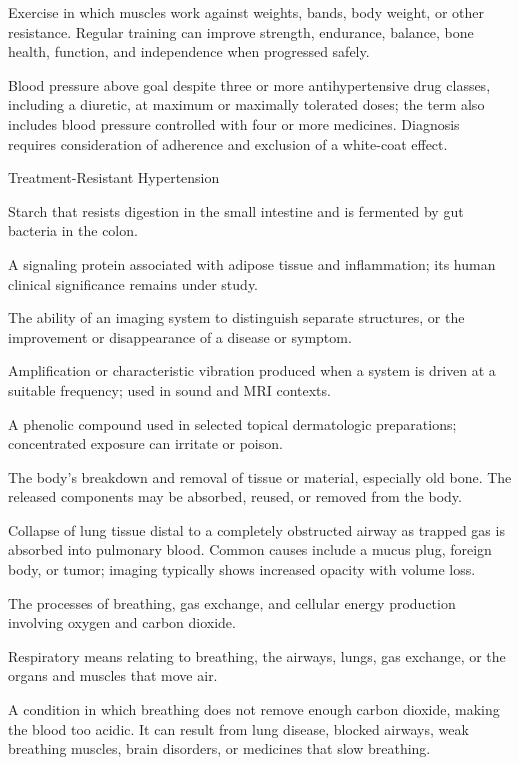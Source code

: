  Exercise in which muscles work against weights, bands, body weight, or other resistance. Regular training can improve strength, endurance, balance, bone health, function, and independence when progressed safely.

 Blood pressure above goal despite three or more antihypertensive drug classes, including a diuretic, at maximum or maximally tolerated doses; the term also includes blood pressure controlled with four or more medicines. Diagnosis requires consideration of adherence and exclusion of a white-coat effect.

\synonyms
Treatment-Resistant Hypertension

 Starch that resists digestion in the small intestine and is fermented by gut bacteria in the colon.

 A signaling protein associated with adipose tissue and inflammation; its human clinical significance remains under study.

 The ability of an imaging system to distinguish separate structures, or the improvement or disappearance of a disease or symptom.

 Amplification or characteristic vibration produced when a system is driven at a suitable frequency; used in sound and MRI contexts.

 A phenolic compound used in selected topical dermatologic preparations; concentrated exposure can irritate or poison.

 The body's breakdown and removal of tissue or material, especially old bone. The released components may be absorbed, reused, or removed from the body.

 Collapse of lung tissue distal to a completely obstructed airway as trapped gas is absorbed into pulmonary blood. Common causes include a mucus plug, foreign body, or tumor; imaging typically shows increased opacity with volume loss.

 The processes of breathing, gas exchange, and cellular energy production involving oxygen and carbon dioxide.

 Respiratory means relating to breathing, the airways, lungs, gas exchange, or the organs and muscles that move air.

 A condition in which breathing does not remove enough carbon dioxide, making the blood too acidic. It can result from lung disease, blocked airways, weak breathing muscles, brain disorders, or medicines that slow breathing.

